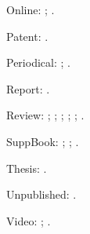 \documentclass[a4paper,12pt]{report}
\begin{document}
Online: \autocite{harwood:biden}; \autocite{powell:email}.

Patent: \autocite{petroff:impurity}.

Periodical: \autocite{good:wholeissue}; \autocite{whittington:water}.

Report: \autocite{herwign:office}.

Review: \autocite{ac:comment}; \autocite{bundy:macneil};
\autocite{Clemens:letter}; \autocite{kozinn:review};
\autocite{ratliff:review}; \autocite{wallraff:word}. 

SuppBook: \autocite{friedman:intro}; \autocite{polakow:afterw};
\autocite{prose:intro}.

Thesis: \autocite{murphy:silent}.

Unpublished: \autocite{nass:address}.

Video: \autocite{cleese:holygrail}; \autocite{hitchcock:nbynw}.


\printbibliography[notkeyword=nosample,title=References]
\end{document}
